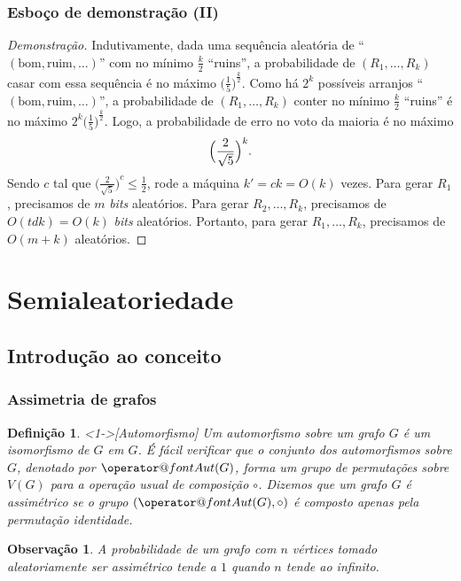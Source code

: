\documentclass{beamer}
\makeatletter
\def\MMp{\mathrm{.}} %
\def\leq{\leqslant} %
\def\Aut{\mathop{\operator@font Aut}}
\theoremstyle{teoaxicorlem}
\theoremstyle{defnotnom}
\newtheorem{Def}{Definição}
\newtheorem{Obs}{Observação}
\newenvironment{dem}%
	{\begin{proof}[Demonstração]}%
	{\end{proof}}
\makeatother
\begin{document}
\begin{frame}
  \frametitle{Esboço de demonstração (II)}
  \begin{dem}
    \small
    Indutivamente, dada uma sequência aleatória de
    ``$(\text{bom},\text{ruim},\dotsc)$'' com no mínimo $\frac{k}2$
    ``ruins'', a probabilidade de $(R_1,\dotsc,R_k)$ casar com essa
    sequência é no máximo ${\bigl(\frac15\bigr)}^{\frac{k}2}$.\pause
    Como há $2^k$ possíveis arranjos
    ``$(\text{bom},\text{ruim},\dotsc)$'',
    a probabilidade de $(R_1,\dotsc,R_k)$ conter no mínimo $\frac{k}2$
    ``ruins'' é no máximo $2^k{\bigl(\frac15\bigr)}^{\frac{k}2}$.\pause
    Logo, a probabilidade de erro no voto da maioria é no máximo
    \begin{equation*}
      \Bigl(\frac2{\sqrt 5}\Bigr)^k\MMp
    \end{equation*}
    \pause Sendo $c$ tal que ${\bigl(\frac{2}{\sqrt 5}\bigr)}^c\leq
    \frac12$, rode a máquina $k'=ck=O(k)$ vezes.
    \pause Para gerar $R_1$, precisamos de $m$ \textit{bits}
    aleatórios. \pause
    Para gerar $R_2,\dotsc,R_k$, precisamos de $O(tdk) = O(k)$
    \textit{bits} aleatórios. \pause
    Portanto, para gerar $R_1,\dotsc,R_k$, precisamos de $O(m+k)$
     aleatórios.
  \end{dem}
\end{frame}

\section{Semialeatoriedade}

\subsection{Introdução ao conceito}

\begin{frame}
  \frametitle{Assimetria de grafos}
  \begin{Def}<1->[Automorfismo]
      Um \alert{automorfismo}
      sobre um grafo $G$ é um isomorfismo de $G$ em
      $G$. É
      fácil verificar que o conjunto dos automorfismos sobre $G$,
      denotado por $\Aut(G)$, forma um grupo de permutações sobre $V(G)$
      para a  operação usual de composição $\circ$. Dizemos que um grafo
      $G$ é  \alert{assimétrico} se o grupo $(\Aut(G),\circ)$ é composto
      apenas pela  permutação identidade.
  \end{Def}
  \vfill
  \begin{Obs}
    A probabilidade de um
    grafo com $n$ vértices tomado aleatoriamente ser assimétrico tende a
    $1$ quando $n$ tende ao infinito.
  \end{Obs}
\end{frame}
\end{document}
